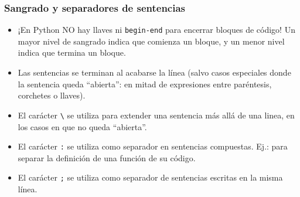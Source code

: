 \documentclass[ucs]{beamer}
\begin{document}







%
%
%
 







\begin{frame}[fragile]
\frametitle{Sangrado y separadores de sentencias}

\begin{itemize}
\item ¡En Python NO hay llaves ni \verb|begin-end| para encerrar bloques
  de código! Un mayor nivel de sangrado indica que comienza un bloque,
  y un menor nivel indica que termina un bloque.
  
\item Las sentencias se terminan al acabarse la línea (salvo casos
  especiales donde la sentencia queda ``abierta'': en mitad de
  expresiones entre paréntesis, corchetes o llaves).
  
\item El carácter \verb|\| se utiliza para extender una sentencia más
  allá de una linea, en los casos en que no queda ``abierta''. 

\item El carácter \verb|:| se utiliza como separador en sentencias
  compuestas. Ej.: para separar la definición de una función de su
  código.
  
\item El carácter \verb|;| se utiliza como separador de sentencias
  escritas en la misma línea.

\end{itemize}
\end{frame}
\end{document}
